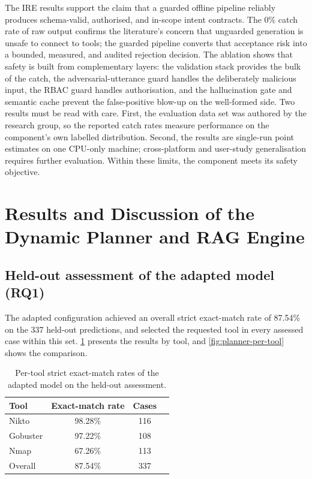 The IRE results support the claim that a guarded offline pipeline reliably
produces schema-valid, authorised, and in-scope intent contracts. The 0\% catch
rate of raw output confirms the literature's concern that unguarded
generation is unsafe to connect to tools; the guarded pipeline converts that
acceptance risk into a bounded, measured, and audited rejection decision. The
ablation shows that safety is built from complementary layers: the validation
stack provides the bulk of the catch, the adversarial-utterance guard handles
the deliberately malicious input, the RBAC guard handles authorisation, and the
hallucination gate and semantic cache prevent the false-positive blow-up on the
well-formed side. Two results must be read with care. First, the evaluation data
set was authored by the research group, so the reported catch rates measure
performance on the component's own labelled distribution. Second, the results
are single-run point estimates on one CPU-only machine; cross-platform and
user-study generalisation requires further evaluation. Within these limits, the
component meets its safety objective.

\section{Results and Discussion of the Dynamic Planner and RAG Engine}\label{sec:results-planner}

\subsection{Held-out assessment of the adapted model (RQ1)}\label{sec:results-planner-heldout}

The adapted configuration achieved an overall strict exact-match rate of
87.54\% on the 337 held-out predictions, and selected the requested tool in
every assessed case within this set. \cref{tab:planner-per-tool} presents the
results by tool, and \cref{fig:planner-per-tool} shows the comparison.

\begin{table}[htbp]
  \centering
  \begin{tabular}{@{}lccc@{}}
    \toprule
    \textbf{Tool} & \textbf{Exact-match rate} & \textbf{Cases}\\
    \midrule
    Nikto & 98.28\% & 116\\
    Gobuster & 97.22\% & 108\\
    Nmap & 67.26\% & 113\\
    \midrule
    Overall & 87.54\% & 337\\
    \bottomrule
  \end{tabular}
  \caption{Per-tool strict exact-match rates of the adapted model on the
  held-out assessment.}\label{tab:planner-per-tool}
\end{table}

